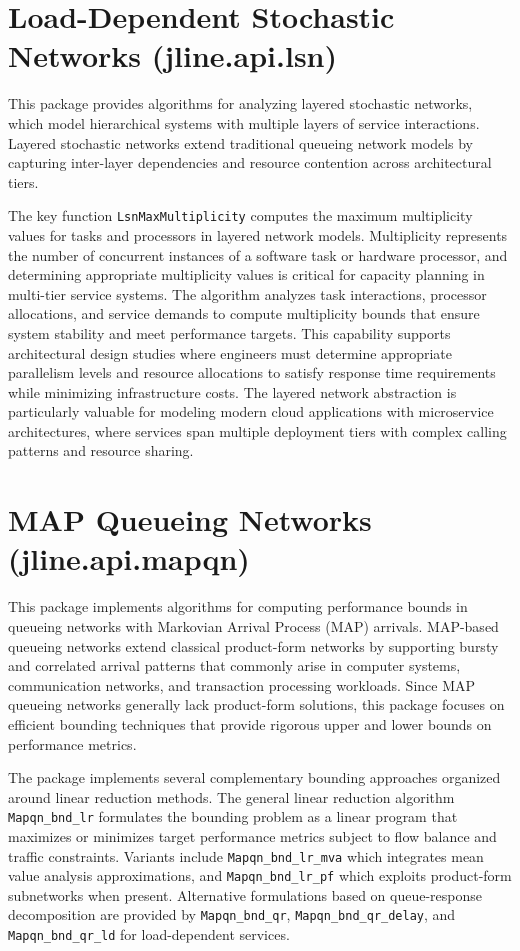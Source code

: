 \section{Load-Dependent Stochastic Networks (jline.api.lsn)}

This package provides algorithms for analyzing layered stochastic networks, which model hierarchical systems with multiple layers of service interactions. Layered stochastic networks extend traditional queueing network models by capturing inter-layer dependencies and resource contention across architectural tiers.

The key function \texttt{LsnMaxMultiplicity} computes the maximum multiplicity values for tasks and processors in layered network models. Multiplicity represents the number of concurrent instances of a software task or hardware processor, and determining appropriate multiplicity values is critical for capacity planning in multi-tier service systems. The algorithm analyzes task interactions, processor allocations, and service demands to compute multiplicity bounds that ensure system stability and meet performance targets. This capability supports architectural design studies where engineers must determine appropriate parallelism levels and resource allocations to satisfy response time requirements while minimizing infrastructure costs. The layered network abstraction is particularly valuable for modeling modern cloud applications with microservice architectures, where services span multiple deployment tiers with complex calling patterns and resource sharing.

\section{MAP Queueing Networks (jline.api.mapqn)}

This package implements algorithms for computing performance bounds in queueing networks with Markovian Arrival Process (MAP) arrivals. MAP-based queueing networks extend classical product-form networks by supporting bursty and correlated arrival patterns that commonly arise in computer systems, communication networks, and transaction processing workloads. Since MAP queueing networks generally lack product-form solutions, this package focuses on efficient bounding techniques that provide rigorous upper and lower bounds on performance metrics.

The package implements several complementary bounding approaches organized around linear reduction methods. The general linear reduction algorithm \texttt{Mapqn\_bnd\_lr} formulates the bounding problem as a linear program that maximizes or minimizes target performance metrics subject to flow balance and traffic constraints. Variants include \texttt{Mapqn\_bnd\_lr\_mva} which integrates mean value analysis approximations, and \texttt{Mapqn\_bnd\_lr\_pf} which exploits product-form subnetworks when present. Alternative formulations based on queue-response decomposition are provided by \texttt{Mapqn\_bnd\_qr}, \texttt{Mapqn\_bnd\_qr\_delay}, and \texttt{Mapqn\_bnd\_qr\_ld} for load-dependent services.

